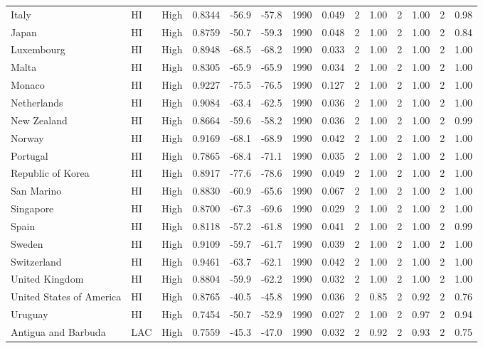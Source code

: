 \begin{longtable}{llrrrrrrrrrrrr}
Italy & HI & High & 0.8344 & -56.9 & -57.8 & 1990 & 0.049 & 2 & 1.00 & 2 & 1.00 & 2 & 0.98 \\
Japan & HI & High & 0.8759 & -50.7 & -59.3 & 1990 & 0.048 & 2 & 1.00 & 2 & 1.00 & 2 & 0.84 \\
Luxembourg & HI & High & 0.8948 & -68.5 & -68.2 & 1990 & 0.033 & 2 & 1.00 & 2 & 1.00 & 2 & 1.00 \\
Malta & HI & High & 0.8305 & -65.9 & -65.9 & 1990 & 0.034 & 2 & 1.00 & 2 & 1.00 & 2 & 1.00 \\
Monaco & HI & High & 0.9227 & -75.5 & -76.5 & 1990 & 0.127 & 2 & 1.00 & 2 & 1.00 & 2 & 1.00 \\
Netherlands & HI & High & 0.9084 & -63.4 & -62.5 & 1990 & 0.036 & 2 & 1.00 & 2 & 1.00 & 2 & 1.00 \\
New Zealand & HI & High & 0.8664 & -59.6 & -58.2 & 1990 & 0.036 & 2 & 1.00 & 2 & 1.00 & 2 & 0.99 \\
Norway & HI & High & 0.9169 & -68.1 & -68.9 & 1990 & 0.042 & 2 & 1.00 & 2 & 1.00 & 2 & 1.00 \\
Portugal & HI & High & 0.7865 & -68.4 & -71.1 & 1990 & 0.035 & 2 & 1.00 & 2 & 1.00 & 2 & 1.00 \\
Republic of Korea & HI & High & 0.8917 & -77.6 & -78.6 & 1990 & 0.049 & 2 & 1.00 & 2 & 1.00 & 2 & 1.00 \\
San Marino & HI & High & 0.8830 & -60.9 & -65.6 & 1990 & 0.067 & 2 & 1.00 & 2 & 1.00 & 2 & 1.00 \\
Singapore & HI & High & 0.8700 & -67.3 & -69.6 & 1990 & 0.029 & 2 & 1.00 & 2 & 1.00 & 2 & 1.00 \\
Spain & HI & High & 0.8118 & -57.2 & -61.8 & 1990 & 0.041 & 2 & 1.00 & 2 & 1.00 & 2 & 0.99 \\
Sweden & HI & High & 0.9109 & -59.7 & -61.7 & 1990 & 0.039 & 2 & 1.00 & 2 & 1.00 & 2 & 1.00 \\
Switzerland & HI & High & 0.9461 & -63.7 & -62.1 & 1990 & 0.042 & 2 & 1.00 & 2 & 1.00 & 2 & 1.00 \\
United Kingdom & HI & High & 0.8804 & -59.9 & -62.2 & 1990 & 0.032 & 2 & 1.00 & 2 & 1.00 & 2 & 1.00 \\
United States of America & HI & High & 0.8765 & -40.5 & -45.8 & 1990 & 0.036 & 2 & 0.85 & 2 & 0.92 & 2 & 0.76 \\
Uruguay & HI & High & 0.7454 & -50.7 & -52.9 & 1990 & 0.027 & 2 & 1.00 & 2 & 0.97 & 2 & 0.94 \\
Antigua and Barbuda & LAC & High & 0.7559 & -45.3 & -47.0 & 1990 & 0.032 & 2 & 0.92 & 2 & 0.93 & 2 & 0.75 \\

\end{longtable}
